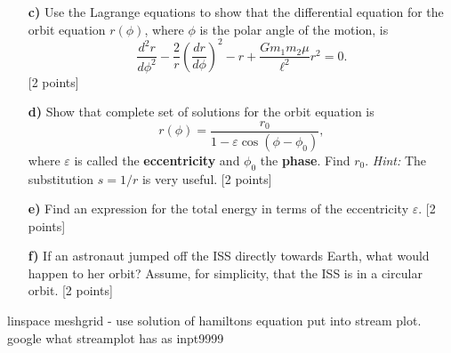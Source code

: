 \documentclass[11pt,a4paper]{report}
\newcounter{excount}[chapter]
\newenvironment{exercise}[1][]{\addtocounter{excount}{1} \noindent {\bf Question
    \arabic{excount} \ \ #1}\hspace{2mm}}{\vspace{4mm}}
\begin{document}
\begin{exercise}{\bf Orbital motion\\}
\begin{itemize}
Give a qualitative description of the different types of motion that can be read out of the diagram and comment on how the situation changes with increasing $\ell$. {\it Hint:} For those using {\tt python} the plotting framework {\tt pyplot} has a useful plotting command for phase space plots called {\tt streamplot}.  [4 points]
\item[{\bf c)}] Use the Lagrange equations to show that the differential equation for the orbit equation $r(\phi)$, where $\phi$ is the polar angle of the motion, is
\begin{equation}
\frac{d^2r}{d\phi^2}-\frac{2}{ r}\left(\frac{dr}{d\phi}\right)^2-r+\frac{Gm_1m_2\mu }{\ell^2}r^2=0.
\end{equation}
[2 points]
\item[{\bf d)}] Show that complete set of solutions for the orbit equation  is
\begin{equation}
r(\phi)= \frac{r_0}{1-\varepsilon \cos(\phi-\phi_0)},
\end{equation}
where $\varepsilon$ is called the {\bf eccentricity} and $\phi_0$ the {\bf phase}. Find $r_0$.
{\it Hint:} The substitution $s=1/r$ is very useful. [2 points]
\item[{\bf e)}] Find an expression for the total energy in terms of the eccentricity $\varepsilon$. [2 points]
\item[{\bf f)}] If an astronaut jumped off the ISS directly towards Earth, what would happen to her orbit? Assume, for simplicity, that the ISS is in a circular orbit. [2 points]
\end{itemize}
\end{exercise}


linspace meshgrid - use solution of hamiltons equation put into stream plot. google what streamplot has as inpt9999
\end{document}
